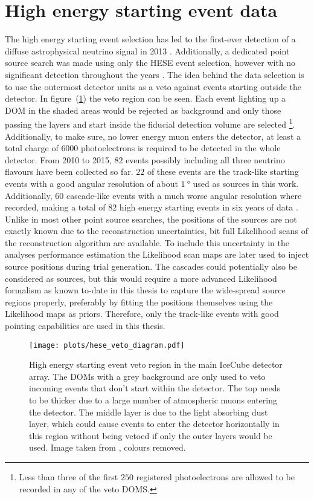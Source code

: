 \section{High energy starting event data}
The high energy starting event selection has led to the first-ever detection of a diffuse astrophysical neutrino signal in 2013 .
Additionally, a dedicated point source search was made using only the HESE event selection, however with no significant detection throughout the years .
The idea behind the data selection is to use the outermost detector units as a veto against events starting outside the detector.
In figure~(\ref{fig:data_hese_veto}) the veto region can be seen.
Each event lighting up a DOM in the shaded areas would be rejected as background and only those passing the layers and start inside the fiducial detection volume are selected \footnote{Less than three of the first $\num{250}$ registered photoelectrons are allowed to be recorded in any of the veto DOMS. }.
Additionally, to make sure, no lower energy muon enters the detector, at least a total charge of $\num{6000}$ photoelectrons is required to be detected in the whole detector.
From 2010 to 2015, $\num{82}$ events possibly including all three neutrino flavours have been collected so far.
$\num{22}$ of these events are the track-like starting events with a good angular resolution of about $\SI{1}{\degree}$ used as sources in this work.
Additionally, $\num{60}$ cascade-like events with a much worse angular resolution where recorded, making a total of $\num{82}$ high energy starting events in six years of data .
Unlike in most other point source searches, the positions of the sources are not exactly known due to the reconstruction uncertainties, bit full Likelihood scans of the reconstruction algorithm are available.
To include this uncertainty in the analyses performance estimation the Likelihood scan maps are later used to inject source positions during trial generation.
The cascades could potentially also be considered as sources, but this would require a more advanced Likelihood formalism as known to-date in this thesis to capture the wide-spread source regions properly, preferably by fitting the positions themselves using the Likelihood maps as priors.
Therefore, only the track-like events with good pointing capabilities are used in this thesis.

\begin{figure}[htbp]
  \centering
  \texttt{[image: plots/hese\_veto\_diagram.pdf]}
  \caption[High energy starting event veto region]{
    High energy starting event veto region in the main IceCube detector array.
    The  DOMs with a grey background are only used to veto incoming events that don't start within the detector.
    The top needs to be thicker due to a large number of atmospheric muons entering the detector.
    The middle layer is due to the light absorbing dust layer, which could cause events to enter the detector horizontally in this region without being vetoed if only the outer layers would be used.
    Image taken from , colours removed.
  }
  \label{fig:data_hese_veto}
\end{figure}

